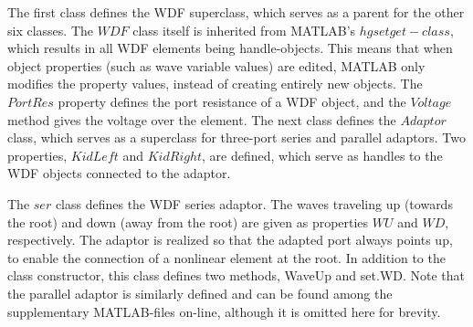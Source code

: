 \documentclass[10pt,a4paper,oneside]{article}
\begin{document}
The first class defines the WDF superclass, which serves as a parent for the other six classes. The $WDF$ class itself is inherited from MATLAB’s $hgsetget-class$, which results in all WDF elements being handle-objects. This means that when object properties (such as wave variable values) are edited, MATLAB only modifies the property values, instead of creating entirely new objects. The $PortRes$ property defines the port resistance of a WDF object, and the $Voltage$ method gives the voltage over the element. The next class defines the $Adaptor$ class, which serves as a superclass for three-port series and parallel adaptors. Two properties, $KidLeft$ and $KidRight$, are defined, which serve as handles to the WDF objects connected to the adaptor.

The $ser$ class defines the WDF series adaptor. The waves traveling up (towards the root) and down (away from the root) are given as properties $WU$ and $WD$, respectively. The adaptor is realized so that the adapted port always points up, to enable the connection of a nonlinear element at the root. In addition to the class constructor, this class defines two methods, WaveUp and set.WD. Note that the parallel adaptor is similarly defined and can be found among the supplementary MATLAB-files on-line, although it is omitted here for brevity.
\end{document}
